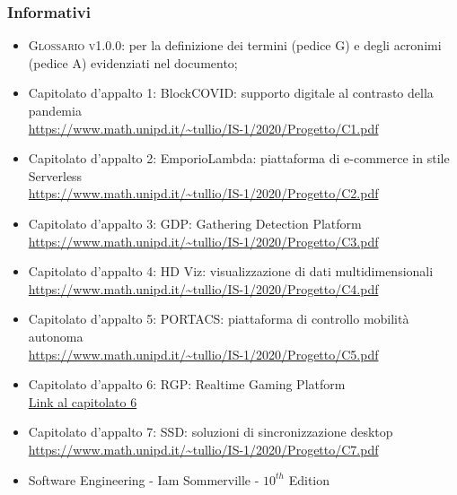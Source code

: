 \subsubsection{Informativi}
\begin{itemize}
	\item \textsc{Glossario v1.0.0}: per la definizione dei termini (pedice G) e degli acronimi (pedice A) evidenziati nel documento;
	\item Capitolato d'appalto 1: BlockCOVID: supporto digitale al contrasto della pandemia\\
	\url{https://www.math.unipd.it/~tullio/IS-1/2020/Progetto/C1.pdf}
	\item Capitolato d'appalto 2: EmporioLambda: piattaforma di e-commerce in stile Serverless\\
	\url{https://www.math.unipd.it/~tullio/IS-1/2020/Progetto/C2.pdf}
	\item Capitolato d'appalto 3: GDP: Gathering Detection Platform\\
	\url{https://www.math.unipd.it/~tullio/IS-1/2020/Progetto/C3.pdf}
	\item Capitolato d'appalto 4: HD Viz: visualizzazione di dati multidimensionali\\
	\url{https://www.math.unipd.it/~tullio/IS-1/2020/Progetto/C4.pdf}
	\item Capitolato d'appalto 5: PORTACS: piattaforma di controllo mobilità autonoma\\
	\url{https://www.math.unipd.it/~tullio/IS-1/2020/Progetto/C5.pdf}
	\item Capitolato d'appalto 6: RGP: Realtime Gaming Platform\\
 \href{https://sesaspa-my.sharepoint.com/:b:/g/personal/s_dindo_vargroup_it/EThvay0f6KVCoXydYOce2lkBt-MYcnW1yafRXFXVIOIsHg?e=2emZZI}{Link al capitolato 6}
	\item Capitolato d'appalto 7: SSD: soluzioni di sincronizzazione desktop\\
	\url{https://www.math.unipd.it/~tullio/IS-1/2020/Progetto/C7.pdf}
	\item Software Engineering - Iam Sommerville - $10^{th}$ Edition
\end{itemize}